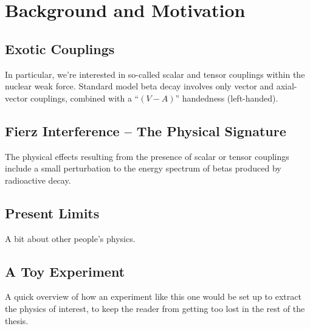 


\clearpage
\chapter{Background and Motivation}
\label{background_chapter}

\section{Exotic Couplings}
	In particular, we're interested in so-called scalar and tensor couplings within the nuclear weak force. Standard model beta decay involves only vector and axial-vector couplings, combined with a ``$(V-A)$'' handedness (left-handed).  

\section{Fierz Interference -- The Physical Signature}
	The physical effects resulting from the presence of scalar or tensor couplings include a small perturbation to the energy spectrum of betas produced by radioactive decay.  


\section{Present Limits}
	A bit about other people's physics.

\section{A Toy Experiment}
	A quick overview of how an experiment like this one would be set up to extract the physics of interest, to keep the reader from getting too lost in the rest of the thesis.


